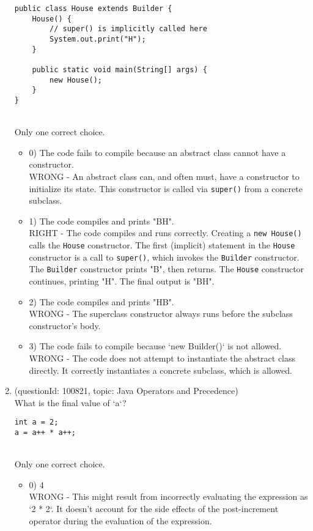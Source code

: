 \documentclass[12pt]{article}
\begin{document}
\begin{enumerate}[label=(\arabic*)]
\begin{verbatim}
public class House extends Builder {
    House() {
        // super() is implicitly called here
        System.out.print("H");
    }

    public static void main(String[] args) {
        new House();
    }
}
\end{verbatim}
\\ \noindent Only one correct choice. 
\begin{itemize}
\item 0) The code fails to compile because an abstract class cannot have a constructor.
 \\ 
WRONG - An abstract class can, and often must, have a constructor to initialize its state. This constructor is called via \verb|super()| from a concrete subclass.

\item 1) The code compiles and prints "BH".
 \\ 
RIGHT - The code compiles and runs correctly. Creating a \verb|new House()| calls the \verb|House| constructor. The first (implicit) statement in the \verb|House| constructor is a call to \verb|super()|, which invokes the \verb|Builder| constructor. The \verb|Builder| constructor prints "B", then returns. The \verb|House| constructor continues, printing "H". The final output is "BH".

\item 2) The code compiles and prints "HB".
 \\ 
WRONG - The superclass constructor always runs before the subclass constructor's body.

\item 3) The code fails to compile because `new Builder()` is not allowed.
 \\ 
WRONG - The code does not attempt to instantiate the abstract class directly. It correctly instantiates a concrete subclass, which is allowed.

\end{itemize}
\item (questionId: 100821, topic: Java Operators and Precedence) \\ 
What is the final value of `a`?\n\begin{verbatim}
int a = 2;
a = a++ * a++;
\end{verbatim}
\\ \noindent Only one correct choice. 
\begin{itemize}
\item 0) 4
 \\ 
WRONG - This might result from incorrectly evaluating the expression as `2 * 2`. It doesn't account for the side effects of the post-increment operator during the evaluation of the expression.


\end{itemize}
\end{enumerate}
\end{document}
